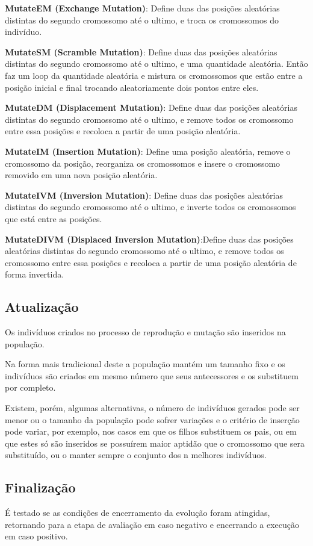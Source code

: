 \textbf{MutateEM (Exchange Mutation)}: Define duas das posições aleatórias distintas do segundo cromossomo até o ultimo, e troca os cromossomos do indivíduo.

\textbf{MutateSM (Scramble Mutation)}: Define duas das posições aleatórias distintas do segundo cromossomo até o ultimo, e uma quantidade aleatória. Então faz um loop da quantidade aleatória e mistura os cromossomos que estão entre a posição inicial e final trocando aleatoriamente dois pontos entre eles.

\textbf{MutateDM (Displacement Mutation)}: Define duas das posições aleatórias distintas do segundo cromossomo até o ultimo, e remove todos os cromossomo entre essa posições e recoloca a partir de uma posição aleatória.

\textbf{MutateIM (Insertion Mutation)}: Define uma posição aleatória, remove o cromossomo da posição, reorganiza os cromossomos e insere o cromossomo removido em uma nova posição aleatória.

\textbf{MutateIVM (Inversion Mutation)}: Define duas das posições aleatórias distintas do segundo cromossomo até o ultimo, e inverte todos os cromossomos que está entre as posições.

\textbf{MutateDIVM (Displaced Inversion Mutation)}:Define duas das posições aleatórias distintas do segundo cromossomo até o ultimo, e remove todos os cromossomo entre essa posições e recoloca a partir de uma posição aleatória de forma invertida.

\subsection{Atualização}
Os indivíduos criados no processo de reprodução e mutação são inseridos na população.

Na forma mais tradicional deste a população mantém um tamanho fixo e os indivíduos são criados em mesmo número que seus antecessores e os substituem por completo. 

Existem, porém, algumas alternativas, o número de indivíduos gerados pode ser menor ou o tamanho da população pode sofrer variações e o critério de inserção pode variar, por exemplo, nos casos em que os filhos substituem os pais, ou em que estes só são inseridos se possuírem maior aptidão que o cromossomo que sera substituído, ou o manter sempre o conjunto dos n melhores indivíduos. 

\subsection{Finalização}
É testado se as condições de encerramento da evolução foram atingidas, retornando para a etapa de avaliação em caso negativo e encerrando a execução em caso positivo.

